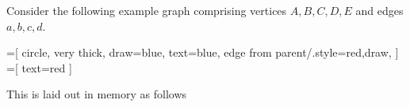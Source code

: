 \newcommand{\edge}[6]{
  \matrix (e) at (e.south west) [spot matrix]
  {
  	\node (e#6c1) [text=blue] {#1}; \\
    \node (e#6c2) [text=blue] {#2}; \\
    \node (e#6c3) [text=red]  {#3}; \\
    \node (e#6c4) [text=red]  {#4}; \\
    \node (e#6c5) [minimum height=9mm] {}; \\
  };
	\node at (e#6c1.west) [text width=2mm, draw=none, xshift=2mm, text=black] {$#6$};
	\node at (e#6c1.west) [text width=3mm, draw=none, xshift=-1mm, text=red, font=\scriptsize] {#5};
}

Consider the following example graph comprising vertices $A, B, C, D, E$ and edges $a, b, c, d$.
\begin{center}
	=[
			circle,
			very thick,
			draw=blue,
			text=blue,
			edge from parent/.style={red,draw},
		]
	=[
			text=red
		]
	
\end{center}
This is laid out in memory as follows
